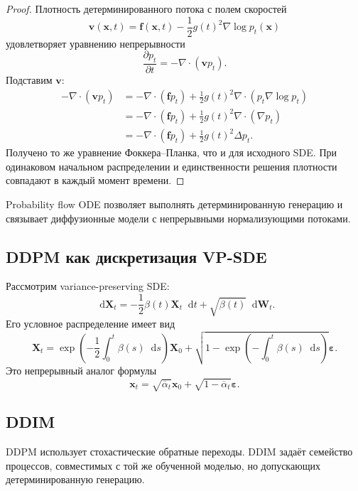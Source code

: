 \documentclass[12pt,a4paper]{article}
\theoremstyle{definition}
\newcommand{\dd}{\mathop{}\!\mathrm{d}}
\newcommand{\eps}{\varepsilon}
\newcommand{\1}{\mathbf{1}}
\begin{document}
\begin{proof}
Плотность детерминированного потока с полем скоростей
\[
    \bm{v}(\bm{x},t)
    =
    \bm{f}(\bm{x},t)
    -
    \frac{1}{2}g(t)^2\nabla\log p_t(\bm{x})
\]
удовлетворяет уравнению непрерывности
\[
    \frac{\partial p_t}{\partial t}
    =
    -\nabla\cdot(\bm{v}p_t).
\]
Подставим $\bm{v}$:
\begin{align*}
    -\nabla\cdot(\bm{v}p_t)
    &=
    -\nabla\cdot(\bm{f}p_t)
    +
    \frac{1}{2}g(t)^2
    \nabla\cdot
    \left(
        p_t\nabla\log p_t
    \right)\\
    &=
    -\nabla\cdot(\bm{f}p_t)
    +
    \frac{1}{2}g(t)^2
    \nabla\cdot(\nabla p_t)\\
    &=
    -\nabla\cdot(\bm{f}p_t)
    +
    \frac{1}{2}g(t)^2\Delta p_t.
\end{align*}
Получено то же уравнение Фоккера--Планка, что и для исходного SDE.
При одинаковом начальном распределении и единственности решения
плотности совпадают в каждый момент времени.
\end{proof}

Probability flow ODE позволяет выполнять детерминированную генерацию и
связывает диффузионные модели с непрерывными нормализующими потоками.

\subsection{DDPM как дискретизация VP-SDE}

Рассмотрим variance-preserving SDE:
\[
    \dd\bm{X}_t
    =
    -\frac{1}{2}\beta(t)\bm{X}_t\dd t
    +
    \sqrt{\beta(t)}\dd\bm{W}_t.
\]
Его условное распределение имеет вид
\[
    \bm{X}_t
    =
    \exp\left(
        -\frac{1}{2}\int_0^t\beta(s)\dd s
    \right)\bm{X}_0
    +
    \sqrt{
        1-
        \exp\left(
            -\int_0^t\beta(s)\dd s
        \right)
    }\bm{\eps}.
\]
Это непрерывный аналог формулы
\[
    \bm{x}_t
    =
    \sqrt{\overline{\alpha}_t}\bm{x}_0
    +
    \sqrt{1-\overline{\alpha}_t}\bm{\eps}.
\]

\subsection{DDIM}

DDPM использует стохастические обратные переходы. DDIM задаёт семейство
процессов, совместимых с той же обученной моделью, но допускающих
детерминированную генерацию.
\end{document}

